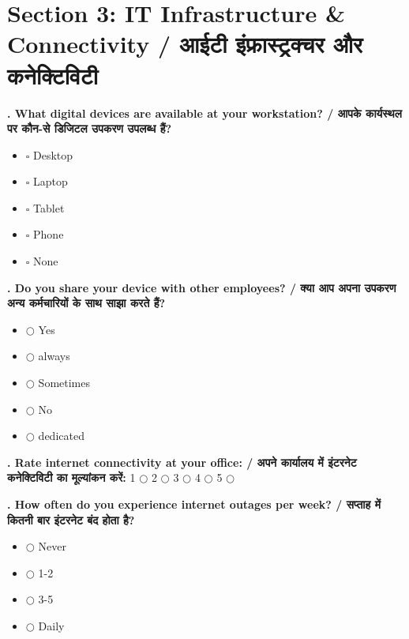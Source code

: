 \documentclass[11pt,a4paper]{article}
\newcounter{qcounter}
\begin{document}
\section*{Section 3: IT Infrastructure & Connectivity / आईटी इंफ्रास्ट्रक्चर और कनेक्टिविटी}
\vspace{0.2cm}
\textbf{. What digital devices are available at your workstation? / आपके कार्यस्थल पर कौन-से डिजिटल उपकरण उपलब्ध हैं?}
\vspace{0.1cm}
\begin{itemize}[label=, itemsep=0.1cm, leftmargin=0.5cm]
    \item $\square$ Desktop
    \item $\square$ Laptop
    \item $\square$ Tablet
    \item $\square$ Phone
    \item $\square$ None
\end{itemize}
\vspace{0.2cm}

\textbf{. Do you share your device with other employees? / क्या आप अपना उपकरण अन्य कर्मचारियों के साथ साझा करते हैं?}
\vspace{0.1cm}
\begin{itemize}[label=, itemsep=0.1cm, leftmargin=0.5cm]
    \item $\bigcirc$ Yes
    \item $\bigcirc$ always
    \item $\bigcirc$ Sometimes
    \item $\bigcirc$ No
    \item $\bigcirc$ dedicated
\end{itemize}
\vspace{0.2cm}

\textbf{. Rate internet connectivity at your office: / अपने कार्यालय में इंटरनेट कनेक्टिविटी का मूल्यांकन करें:}
\vspace{0.1cm}
\vspace{0.1cm}
1 $\bigcirc$ \hspace{1cm} 2 $\bigcirc$ \hspace{1cm} 3 $\bigcirc$ \hspace{1cm} 4 $\bigcirc$ \hspace{1cm} 5 $\bigcirc$
\vspace{0.4cm}

\textbf{. How often do you experience internet outages per week? / सप्ताह में कितनी बार इंटरनेट बंद होता है?}
\vspace{0.1cm}
\begin{itemize}[label=, itemsep=0.1cm, leftmargin=0.5cm]
    \item $\bigcirc$ Never
    \item $\bigcirc$ 1-2
    \item $\bigcirc$ 3-5
    \item $\bigcirc$ Daily
\end{itemize}
\vspace{0.2cm}
\end{document}
